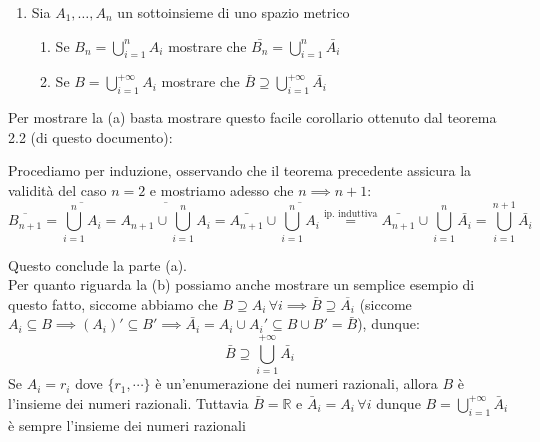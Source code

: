 \documentclass{report}
\begin{document}
\begin{mysolution}
\end{mysolution}
\begin{enumerate}[resume, label=\protect\circled{\arabic*}]
	\item Sia $A_1, \ldots, A_n$ un sottoinsieme di uno spazio metrico
	\begin{enumerate}
		\item Se $B_n = \bigcup\limits_{i=1}^n A_i$ mostrare che $\bar{B_n} = \bigcup\limits_{i=1}^n \bar{A_i}$
		\item Se $B = \bigcup\limits_{i=1}^{+\infty} A_i$ mostrare che $\bar{B} \supseteq \bigcup\limits_{i=1}^{+\infty} \bar{A_i}$
	\end{enumerate}
\end{enumerate}
\begin{mysolution}
	Per mostrare la (a) basta mostrare questo facile corollario ottenuto dal teorema 2.2 (di questo documento):
\begin{myproof}
	Procediamo per induzione, osservando che il teorema precedente  assicura la validità del caso $n=2$ e mostriamo adesso che $n \implies n+1$:
	$$
		\overline{B_{n+1}} = \overline{\bigcup_{i=1}^n A_i} = \overline{A_{n+1} \cup \bigcup_{i=1}^n A_i} = \bar{A_{n+1}} \cup \overline{\bigcup_{i=1}^n A_i} \stackrel{\text{ip. induttiva}}{=} \bar{A_{n+1}} \cup \bigcup_{i=1}^{n} \bar{A_i} = \bigcup_{i=1}^{n+1} \bar{A_i}
	$$
\end{myproof}
\noindent Questo conclude la parte (a). \\
Per quanto riguarda la (b) possiamo anche mostrare un semplice esempio di questo fatto, siccome abbiamo che $B \supseteq A_i \, \forall i \implies \bar{B} \supseteq \overline{A_i}$ (siccome $A_i \subseteq B \implies (A_i)' \subseteq B' \implies \bar{A_i} = A_i \cup A_i'\subseteq B \cup B' = \bar{B}$), dunque:
$$
	\bar{B} \supseteq \bigcup_{i=1}^{+\infty} \bar{A_i}
$$
Se $A_i = r_i$ dove $\{ r_1, \cdots \}$ è un'enumerazione dei numeri razionali, allora $B$ è l'insieme dei numeri razionali. Tuttavia $\bar{B}=\mathbb{R}$ e $\bar{A}_i = A_i \, \forall i$ dunque $B = \bigcup\limits_{i=1}^{+\infty} \bar{A}_i$ è sempre l'insieme dei numeri razionali
\end{mysolution}
\end{document}
